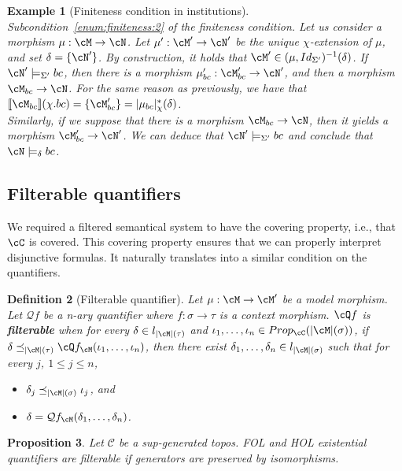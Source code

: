 \documentclass[preprint,3p,times]{elsarticle}
\newtheorem{definition}{Definition}[section]
\newtheorem{proposition}[definition]{Proposition}
\newtheorem{example}[definition]{Example}
\def\sem#1{[\![ #1 ] \!]}
\newcommand{\Qf}{\mathcal{Q}f}
\begin{document}
\begin{example}[Finiteness condition in institutions]
\medskip
\emph{Subcondition~\ref{enum:finiteness:2} of the finiteness condition.}
Let us consider a morphism $\mu: \cM \to \cN$. Let $\mu' : \cM' \to \cN'$ be the unique $\chi$-extension of $\mu$, and set $\delta = \{\cN'\}$. By construction, it holds that $\cM' \in (\mu,Id_{\Sigma'})^{-1}(\delta)$.  If $\cN' \models_{\Sigma'} bc$, then there is a morphism $\mu'_{bc} : \cM'_{bc} \to \cN'$, and then a morphism $\cM_{bc} \to \cN$. For the same reason as previously, we have that $\sem{\cM_{bc}}(\chi.bc) = \{\cM'_{bc}\} = |\mu_{bc}|^*_\chi(\delta)$. \\
Similarly, if we suppose that there is a morphism $\cM_{bc} \to \cN$, then it yields a morphism $\cM'_{bc} \to \cN'$.
We can deduce that $\cN' \models_{\Sigma'} bc$ and conclude that $\cN \models_\delta bc$.
\end{example}

\subsection{Filterable quantifiers}
\label{subsec:los:quantifiers}

We required a filtered semantical system to have the covering property, i.e., that \(\cC\) is covered. This covering property ensures that we can properly interpret disjunctive formulas. It naturally translates into a similar condition on the quantifiers.

\begin{definition}[Filterable quantifier]
\label{def:filterable quantifier}
Let $\mu : \cM \to \cM'$ be a model morphism. Let $\Qf$ be a n-ary quantifier where $f : \sigma \to \tau$ is a context morphism.
$\cQ f$ is {\bf filterable} when for every $\delta \in l_{|\cM|(\tau)}$ and $\iota_1,\ldots,\iota_n \in Prop_\cC(|\cM|(\sigma))$, if $\delta \preceq_{|\cM|(\tau)} \cQ f_\cM(\iota_1,\ldots,\iota_n)$, then  there exist $\delta_1,\ldots,\delta_n \in l_{|\cM|(\sigma)}$ such that for every $j$, $1 \leq j \leq n$,
\begin{itemize}
	\item $\delta_j \preceq_{|\cM|(\sigma)} \iota_j$, and
	\item $\delta = \Qf_{\cM}(\delta_1,\ldots,\delta_n)$.
\end{itemize}
\end{definition}

\begin{proposition}
\label{prop:FOL and HOL existential quantifiers are directly filterable}
Let $\mathcal{C}$ be a sup-generated topos. FOL and HOL existential quantifiers are filterable if generators are preserved by isomorphisms.
\end{proposition}
\end{document}
